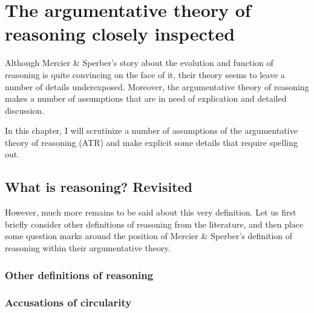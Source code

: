 \chapter{The argumentative theory of reasoning closely inspected}
\label{ch:scrutiny}

Although Mercier \& Sperber's story about the evolution and function of reasoning is quite convincing on the face of it, their theory seems to leave a number of details underexposed. Moreover, the argumentative theory of reasoning makes a number of assumptions that are in need of explication and detailed discussion.

In this chapter, I will scrutinize a number of assumptions of the argumentative theory of reasoning (ATR) and make explicit some details that require spelling out.


\section{What is reasoning? Revisited}
\label{sec:def-scrutiny}

However, much more remains to be said about this very definition. Let us first briefly consider other definitions of reasoning from the literature, and then place some question marks around the position of Mercier \& Sperber's definition of reasoning within their argumentative theory.

\subsection{Other definitions of reasoning}


\subsection{Accusations of circularity}


